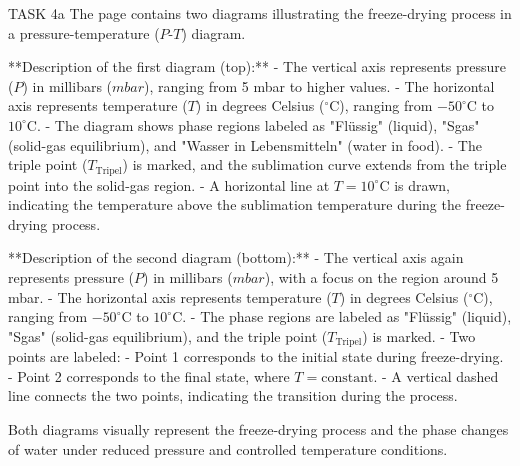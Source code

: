 TASK 4a  
The page contains two diagrams illustrating the freeze-drying process in a pressure-temperature (\(P\)-\(T\)) diagram.  

**Description of the first diagram (top):**  
- The vertical axis represents pressure (\(P\)) in millibars (\(mbar\)), ranging from 5 mbar to higher values.  
- The horizontal axis represents temperature (\(T\)) in degrees Celsius (\(^\circ\text{C}\)), ranging from \(-50^\circ\text{C}\) to \(10^\circ\text{C}\).  
- The diagram shows phase regions labeled as "Flüssig" (liquid), "Sgas" (solid-gas equilibrium), and "Wasser in Lebensmitteln" (water in food).  
- The triple point (\(T_{\text{Tripel}}\)) is marked, and the sublimation curve extends from the triple point into the solid-gas region.  
- A horizontal line at \(T = 10^\circ\text{C}\) is drawn, indicating the temperature above the sublimation temperature during the freeze-drying process.  

**Description of the second diagram (bottom):**  
- The vertical axis again represents pressure (\(P\)) in millibars (\(mbar\)), with a focus on the region around 5 mbar.  
- The horizontal axis represents temperature (\(T\)) in degrees Celsius (\(^\circ\text{C}\)), ranging from \(-50^\circ\text{C}\) to \(10^\circ\text{C}\).  
- The phase regions are labeled as "Flüssig" (liquid), "Sgas" (solid-gas equilibrium), and the triple point (\(T_{\text{Tripel}}\)) is marked.  
- Two points are labeled:  
  - Point 1 corresponds to the initial state during freeze-drying.  
  - Point 2 corresponds to the final state, where \(T = \text{constant}\).  
- A vertical dashed line connects the two points, indicating the transition during the process.  

Both diagrams visually represent the freeze-drying process and the phase changes of water under reduced pressure and controlled temperature conditions.